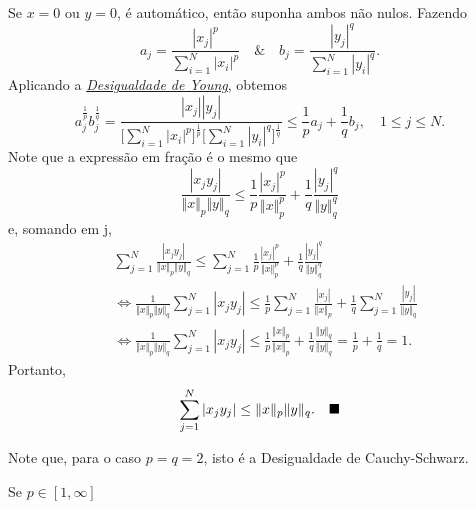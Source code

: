 \documentclass[../functional_analysis.tex]{subfiles}
\begin{document}
\begin{proof*}
	Se \(x=0\) ou \(y=0\), é automático, então suponha ambos não nulos. Fazendo
	\[
		a_{j} = \frac{|x_{j}|^{p}}{\sum\limits_{i=1}^{N}|x_{i}|^{p}} \quad\&\quad b_{j} = \frac{|y_{j}|^{q}}{\sum\limits_{i=1}^{N}|y_{i}|^{q}}.
	\]
	Aplicando a \hyperlink{young_inequality}{\textit{Desigualdade de Young}}, obtemos
	\[
		a_{j}^{\frac{1}{p}}b_{j}^{\frac{1}{q}} = \frac{|x_{j}||y_{j}|}{\biggl[\sum\limits_{i=1}^{N}|x_{i}|^{p}\biggr]^{\frac{1}{p}}\biggl[\sum\limits_{i=1}^{N}|y_{i}|^{q}\biggr]^{\frac{1}{q}}}\leq \frac{1}{p}a_{j} + \frac{1}{q}b_{j}, \quad 1\leq j\leq N.
	\]
	Note que a expressão em fração é o mesmo que
	\[
		\frac{|x_{j}y_{j}|}{\Vert x \Vert_p \Vert y \Vert_q} \leq \frac{1}{p}\frac{|x_{j}|^{p}}{\Vert x \Vert_{p}^{p}} + \frac{1}{q} \frac{|y_{j}|^{q}}{\Vert y \Vert_{q}^{q}}
	\]
	e, somando em j,
	\begin{align*}
		 & \sum\limits_{j=1}^{N}\frac{|x_{j}y_{j}|}{\Vert x \Vert_p \Vert y \Vert_q} \leq \sum\limits_{j=1}^{N} \frac{1}{p}\frac{|x_{j}|^{p}}{\Vert x \Vert_{p}^{p}} + \frac{1}{q} \frac{|y_{j}|^{q}}{\Vert y \Vert_{q}^{q}}                             \\
		 & \Longleftrightarrow \frac{1}{\Vert x \Vert_p \Vert y \Vert_q}\sum\limits_{j=1}^{N}|x_{j}y_{j}| \leq \frac{1}{p}\sum\limits_{j=1}^{N} \frac{|x_{j}|}{\Vert x \Vert_p} + \frac{1}{q} \sum\limits_{j=1}^{N} \frac{|y_{j}|}{\Vert y \Vert_q}      \\
		 & \Longleftrightarrow \frac{1}{\Vert x \Vert_p \Vert y \Vert_q}\sum\limits_{j=1}^{N}|x_{j}y_{j}| \leq \frac{1}{p}\frac{\Vert x \Vert_p}{\Vert x \Vert_p} + \frac{1}{q} \frac{\Vert y \Vert_q}{\Vert y \Vert_q} = \frac{1}{p} + \frac{1}{q} = 1.
	\end{align*}
	Portanto,
	\[
		\sum\limits_{j=1}^{N}|x_{j}y_{j}|\leq \Vert x \Vert_p \Vert y \Vert_q. \quad \text{$\blacksquare$}
	\]
\end{proof*}
Note que, para o caso \(p=q=2\), isto é a Desigualdade de Cauchy-Schwarz.
\hypertarget{minkowski_inequality}{
	\begin{lemma*}
		Se \(p\in [1, \infty]\)
	\end{lemma*}
}
\end{document}

